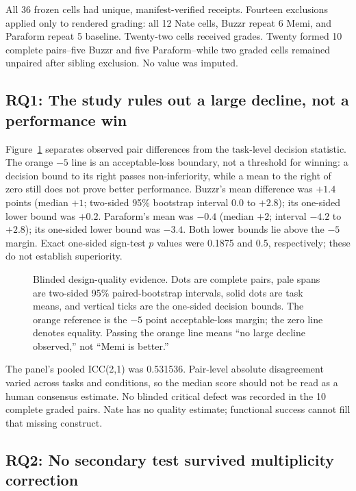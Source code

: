 \documentclass[9pt,twocolumn]{extarticle}
\newcommand{\RQ}[1]{\textbf{RQ#1}}
\begin{document}
All 36 frozen cells had unique, manifest-verified receipts. Fourteen exclusions
applied only to rendered grading: all 12 Nate cells, Buzzr repeat 6 Memi, and
Paraform repeat 5 baseline. Twenty-two cells received grades. Twenty formed 10
complete pairs--five Buzzr and five Paraform--while two graded cells remained
unpaired after sibling exclusion. No value was imputed.

\subsection{\RQ{1}: The study rules out a large decline, not a performance win}

Figure~\ref{fig:quality} separates observed pair differences from the
task-level decision statistic. The orange $-5$ line is an acceptable-loss
boundary, not a threshold for winning: a decision bound to its right passes
non-inferiority, while a mean to the right of zero still does not prove better
performance. Buzzr's mean difference was $+1.4$ points
(median $+1$; two-sided 95\% bootstrap interval $0.0$ to $+2.8$); its one-sided
lower bound was $+0.2$. Paraform's mean was $-0.4$ (median $+2$; interval
$-4.2$ to $+2.8$); its one-sided lower bound was $-3.4$. Both lower bounds lie
above the $-5$ margin. Exact one-sided sign-test $p$ values were 0.1875 and 0.5,
respectively; these do not establish superiority.

\begin{figure}[t]
\centering
\QualityFigure
\caption{Blinded design-quality evidence. Dots are complete pairs, pale spans
are two-sided 95\% paired-bootstrap intervals, solid dots are task means, and
vertical ticks are the one-sided decision bounds. The orange reference is the
$-5$ point acceptable-loss margin; the zero line denotes equality. Passing the
orange line means ``no large decline observed,'' not ``Memi is better.''}
\label{fig:quality}
\end{figure}


The panel's pooled ICC(2,1) was 0.531536. Pair-level absolute disagreement
varied across tasks and conditions, so the median score should not be read as a
human consensus estimate. No blinded critical defect was recorded in the 10
complete graded pairs. Nate has no quality estimate; functional success cannot
fill that missing construct.

\subsection{\RQ{2}: No secondary test survived multiplicity correction}
\end{document}
